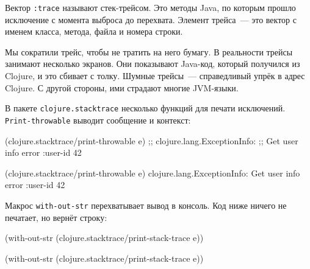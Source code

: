 \fi


Вектор \verb|:trace| называют стек-трейсом. Это методы Java, по которым прошло
исключение с момента выброса до перехвата. Элемент трейса~--- это вектор с именем
класса, метода, файла и номера строки.

Мы сократили трейс, чтобы не тратить на него бумагу. В реальности трейсы
занимают несколько экранов. Они показывают Java-код, который получился из
Clojure, и это сбивает с толку. Шумные трейсы~--- справедливый упрёк в адрес
Clojure. С другой стороны, ими страдают многие JVM-языки.


В пакете \verb|clojure.stacktrace| несколько функций для печати
исключений. \verb|Print-throwable| выводит сообщение и контекст:

\ifx\devicetype\mobile

\begin{english}
  \begin{clojure}
(clojure.stacktrace/print-throwable e)
;; clojure.lang.ExceptionInfo:
;; Get user info error
{:user-id 42}
  \end{clojure}
\end{english}

\else

\begin{english}
  \begin{clojure}
(clojure.stacktrace/print-throwable e)
clojure.lang.ExceptionInfo: Get user info error
{:user-id 42}
  \end{clojure}
\end{english}

\fi

Макрос \verb|with-out-str| перехватывает вывод в консоль. Код ниже ничего не
печатает, но вернёт строку:

\ifx\devicetype\mobile

\begin{english}
  \begin{clojure}
(with-out-str
  (clojure.stacktrace/print-stack-trace
    e))
  \end{clojure}
\end{english}

\else

\begin{english}
  \begin{clojure}
(with-out-str
  (clojure.stacktrace/print-stack-trace e))
  \end{clojure}
\end{english}

